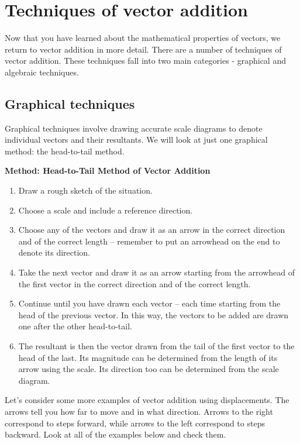 \section{Techniques of vector addition}

Now that you have learned about the mathematical properties of
vectors, we return to vector addition in more detail. There are a number of
techniques of vector addition. These techniques fall into two main categories - graphical and algebraic techniques.

\subsection*{Graphical techniques}
Graphical techniques involve drawing accurate scale diagrams to denote
individual vectors and their resultants. We will look at just one graphical method: the head-to-tail method.


\textbf{Method: Head-to-Tail Method of Vector Addition}
\begin{enumerate}[noitemsep, label=\textbf{\arabic*}.]
\item{Draw a rough sketch of the situation.}
\item{Choose a scale and include a reference direction.}
\item{Choose any of the vectors and draw it as an arrow in the
correct direction and of the correct length -- remember to put an
arrowhead on the end to denote its direction.}
\item{Take the next vector and draw it as an arrow starting from the
arrowhead of the first vector in the correct direction and of the
correct length.}
\item{Continue until you have drawn each vector -- each time starting
from the head of the previous vector. In this way, the vectors to be
added are drawn one after the other head-to-tail.}
\item{The resultant is then the vector drawn from the tail of the
first vector to the head of the last. Its magnitude can be
determined from the length of its arrow using the scale. Its
direction too can be determined from the scale diagram.}
\end{enumerate} \par


\label{m38813*id188482}Let's consider some more examples of vector addition using displacements. The arrows tell you how far to move and in what direction. Arrows to the right correspond to steps forward, while arrows to the left correspond to steps backward. Look at all of the examples below and check them.\par 

